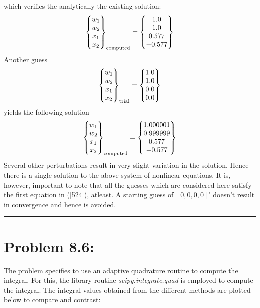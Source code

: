 which verifies the analytically the existing solution: 
\begin{align}
\begin{Bmatrix}
w_1\\w_2\\x_1\\x_2
\end{Bmatrix}_{\rm computed}
=
\begin{Bmatrix}
1.0\\1.0\\0.577\\-0.577
\end{Bmatrix}
\end{align}
Another guess 
\begin{align*}
\begin{Bmatrix}
w_1\\w_2\\x_1\\x_2
\end{Bmatrix}_{\rm trial}
=
\begin{Bmatrix}
1.0\\1.0\\0.0\\0.0
\end{Bmatrix}
\end{align*}
yields the following solution 
\begin{align*}
\begin{Bmatrix}
w_1\\w_2\\x_1\\x_2
\end{Bmatrix}_{\rm computed}
=
\begin{Bmatrix}
1.000001\\0.999999\\0.577\\-0.577
\end{Bmatrix}
\end{align*}
Several other perturbations result in very slight variation in the solution. Hence there is a single solution to the above system of nonlinear equations. It is, however, important to note that all the guesses which are considered here satisfy the first equation in (\ref{524}), atleast. A starting guess of $[0,0,0,0]'$ doesn't result in convergence and hence is avoided. \\ \hrule
\newpage\section*{Problem 8.6: }
The problem specifies to use an adaptive quadrature routine to compute the integral. For this, the library routine \emph{scipy.integrate.quad} is employed to compute the integral. The integral values obtained from the different methods are plotted below to compare and contrast: 
